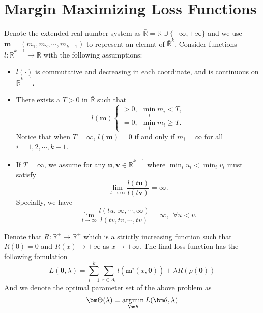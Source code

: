 \section{Margin Maximizing Loss Functions}

Denote the extended real number system as $\bar{\mathbb{R}} = \mathbb{R}\cup \{-\infty,+\infty\}$ and we use $\bm m = (m_1,m_2,\cdots,m_{k-1})$ to represent an elemnt of $\bar{\mathbb{R}}^k$. Consider functions $l: \bar{\mathbb{R}}^{k-1} \rightarrow \mathbb{R}$ with the following assumptions:
\begin{itemize}
	\item $l(\cdot)$ is commutative and decreasing in each coordinate, and is continuous on $\bar{\mathbb{R}}^{k-1}$.
	\item There exists a $T>0$ in $\bar{\mathbb{R}} $ such that 
	\begin{equation}
	l(\bm m)
	\begin{cases}
	> 0,\ \ \min_i m_i < T,\\
	= 0,\ \ \min_i m_i \geq T.
	\end{cases}
	\end{equation}
	Notice that when $T = \infty$, $l(\bm m) = 0$ if and only if $m_i = \infty$ for all $i = 1,2,\cdots,k-1$.
	\item If $T = \infty$, we assume for any $\bm u, \bm v \in \bar{\mathbb{R}}^{k-1}$ where $\min_i u_i < \min_i v_i$ must satisfy
	\begin{equation}
	\lim\limits_{t\rightarrow \infty}\frac{l(t\bm u)}{l(t\bm v)} = \infty.
	\end{equation}
	Specially, we have
	\begin{equation*}
	\lim\limits_{t\rightarrow \infty}\frac{l(tu,\infty,\cdots,\infty)}{l(tv,tv,\cdots,tv)} = \infty,\ \ \forall u<v.
	\end{equation*}
	
\end{itemize}

Denote that $R: \mathbb{R}^{+}\rightarrow \mathbb{R}^{+}$ which is a strictly increasing function such that $R(0) = 0$ and $R(x) \rightarrow +\infty$ as $x\rightarrow +\infty$. The final loss function has the following fomulation
\begin{equation}
L(\bm\theta,\lambda) = \sum_{i =  1}^{k} \sum_{x\in A_i} l(\bm m^i(x,\bm  \theta)) + \lambda R(\rho(\bm\theta))
\end{equation}
And we denote the optimal parameter set of the above problem as
\begin{equation}
\bm\Theta(\lambda) = \mathop{\rm argmin}_{\bm\theta} L(\bm\theta,\lambda) 
\end{equation}



